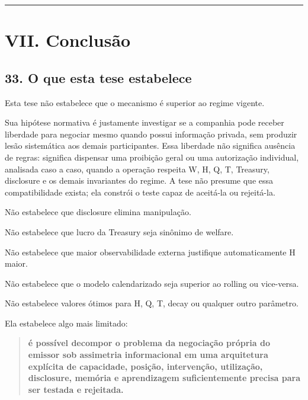 \documentclass[
  a4paper,
]{article}
\begin{document}
\begin{center}\rule{0.5\linewidth}{0.5pt}\end{center}

\hypertarget{vii-conclusao}{}

\hypertarget{vii-conclusuxe3o-1}{%
\section{VII. Conclusão}\label{vii-conclusuxe3o-1}}

\hypertarget{33-o-que-esta-tese-estabelece}{}

\hypertarget{33-o-que-esta-tese-estabelece}{%
\subsection{33. O que esta tese
estabelece}\label{33-o-que-esta-tese-estabelece}}

Esta tese não estabelece que o mecanismo é superior ao regime vigente.

Sua hipótese normativa é justamente investigar se a companhia pode
receber liberdade para negociar mesmo quando possui informação privada,
sem produzir lesão sistemática aos demais participantes. Essa liberdade
não significa ausência de regras: significa dispensar uma proibição
geral ou uma autorização individual, analisada caso a caso, quando a
operação respeita W, H, Q, T, Treasury, disclosure e os demais
invariantes do regime. A tese não presume que essa compatibilidade
exista; ela constrói o teste capaz de aceitá-la ou rejeitá-la.

Não estabelece que disclosure elimina manipulação.

Não estabelece que lucro da Treasury seja sinônimo de welfare.

Não estabelece que maior observabilidade externa justifique
automaticamente H maior.

Não estabelece que o modelo calendarizado seja superior ao rolling ou
vice-versa.

Não estabelece valores ótimos para H, Q, T, decay ou qualquer outro
parâmetro.

Ela estabelece algo mais limitado:

\begin{quote}
\textbf{é possível decompor o problema da negociação própria do emissor
sob assimetria informacional em uma arquitetura explícita de capacidade,
posição, intervenção, utilização, disclosure, memória e aprendizagem
suficientemente precisa para ser testada e rejeitada.}
\end{quote}
\end{document}
